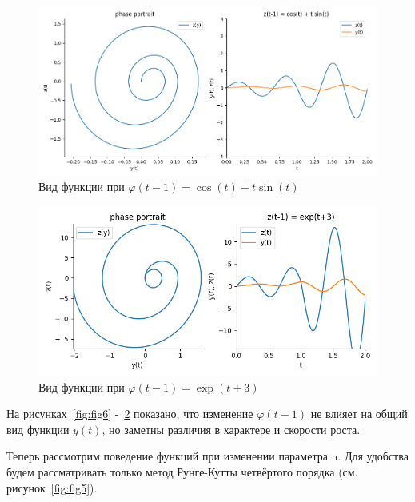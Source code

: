 \documentclass[a4paper,12pt]{article}
\begin{document}
	\begin{figure}[ht!]
		\begin{center}
		\includegraphics[scale=0.65]{figures/fnc2.png}
		\end{center}
		\vspace*{-8mm}
		\caption{Вид функции при $\varphi(t-1) = \cos(t)+t\sin(t)$}\label{fig:fig7}
  	\end{figure}

	\begin{figure}[ht!]
		\begin{center}
		\includegraphics[scale=0.65]{figures/fnc3.png}
		\end{center}
		\vspace*{-8mm}
		\caption{Вид функции при $\varphi(t-1) = \exp(t+3)$}\label{fig:fig8}
  	\end{figure}

	На рисунках~\ref{fig:fig6} -~\ref{fig:fig8} показано, что изменение $\varphi(t-1)$ не влияет на общий 
	вид функции $y(t)$, но заметны различия в характере и скорости роста.

	Теперь рассмотрим поведение функций при изменении параметра n. Для удобства 
	будем рассматривать только метод Рунге-Кутты четвёртого порядка (см. рисунок~\ref{fig:fig5}).
\end{document}
